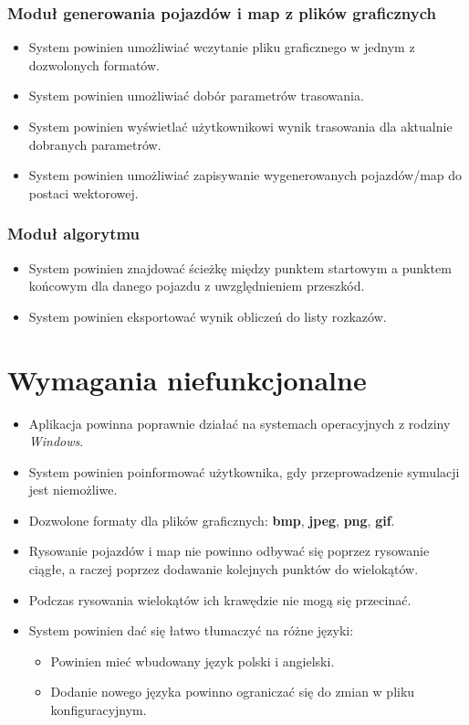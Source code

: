\documentclass{article}
\let\oldsection\section
\renewcommand\section{\clearpage\oldsection} %
\begin{document}
\subsubsection{Moduł generowania pojazdów i map z plików graficznych}
\begin{itemize}
  \item System powinien umożliwiać wczytanie pliku graficznego w jednym z dozwolonych formatów.
  \item System powinien umożliwiać dobór parametrów trasowania.
  \item System powinien wyświetlać użytkownikowi wynik trasowania dla aktualnie dobranych parametrów.
  \item System powinien umożliwiać zapisywanie wygenerowanych pojazdów/map do postaci wektorowej.
\end{itemize}

\subsubsection{Moduł algorytmu}
\begin{itemize}
  \item System powinien znajdować ścieżkę między punktem startowym a punktem końcowym dla danego pojazdu z uwzględnieniem przeszkód.
  \item System powinien eksportować wynik obliczeń do listy rozkazów.
\end{itemize}


\section{Wymagania niefunkcjonalne}

\begin{itemize}
  \item Aplikacja powinna poprawnie działać na systemach operacyjnych z rodziny \textit{Windows}.
  \item System powinien poinformować użytkownika, gdy przeprowadzenie symulacji jest niemożliwe.
  \item Dozwolone formaty dla plików graficznych: \textbf{bmp}, \textbf{jpeg}, \textbf{png}, \textbf{gif}.
  \item Rysowanie pojazdów i map nie powinno odbywać się poprzez rysowanie ciągłe, a raczej poprzez dodawanie kolejnych punktów do wielokątów.
  \item Podczas rysowania wielokątów ich krawędzie nie mogą się przecinać. 
  \item System powinien dać się łatwo tłumaczyć na różne języki:
  \begin{itemize}
    \item Powinien mieć wbudowany język polski i angielski.
    \item Dodanie nowego języka powinno ograniczać się do zmian w pliku konfiguracyjnym.
  \end{itemize}
\end{itemize}
\end{document}
